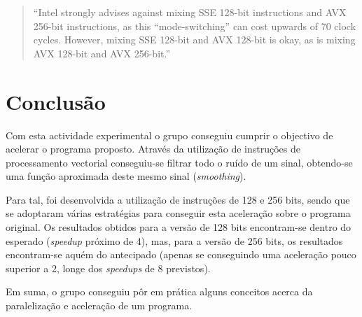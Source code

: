 \documentclass[a4paper]{article}
\begin{document}
	 \begin{quote}
	  ``Intel strongly advises against mixing SSE 128-bit instructions and AVX 256-bit instructions, as this ``mode-switching'' can cost upwards of 70 clock cycles. However, mixing SSE 128-bit and AVX 128-bit is okay, as is mixing AVX 128-bit and AVX 256-bit.''
	 \end{quote}
	   

	
	\section{Conclusão}

	Com esta actividade experimental o grupo conseguiu cumprir o objectivo de acelerar o programa proposto. Através da utilização de instruções de processamento vectorial conseguiu-se filtrar todo o ruído de um sinal, obtendo-se uma função aproximada deste mesmo sinal (\textit{smoothing}).
	
	Para tal, foi desenvolvida a utilização de instruções de 128 e 256 bits, sendo que se adoptaram várias estratégias para conseguir esta aceleração sobre o programa original. Os resultados obtidos para a versão de 128 bits encontram-se dentro do esperado (\textit{speedup} próximo de 4), mas, para a versão de 256 bits, os resultados encontram-se aquém do antecipado (apenas se conseguindo uma aceleração pouco superior a 2, longe dos \textit{speedups} de 8 previstos).
	
	Em suma, o grupo conseguiu pôr em prática alguns conceitos acerca da paralelização e aceleração de um programa.
\end{document}
